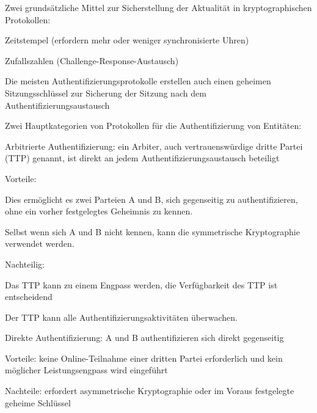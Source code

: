 \documentclass[a4paper]{article}
\begin{document}
\begin{multicols}{3}
\begin{itemize*}
\begin{itemize*}
                  \item Zwei grundsätzliche Mittel zur Sicherstellung der Aktualität in kryptographischen Protokollen:
                  \begin{itemize*} \item Zeitstempel (erfordern mehr oder weniger synchronisierte Uhren) \item Zufallszahlen (Challenge-Response-Austausch) \end{itemize*}
            \end{itemize*}
            \item Die meisten Authentifizierungsprotokolle erstellen auch einen geheimen
            Sitzungsschlüssel zur Sicherung der Sitzung nach dem
            Authentifizierungsaustausch
            \item Zwei Hauptkategorien von Protokollen für die Authentifizierung von
            Entitäten:
            \begin{itemize*}
                  \item Arbitrierte Authentifizierung: ein Arbiter, auch vertrauenswürdige dritte Partei (TTP) genannt, ist direkt an jedem Authentifizierungsaustausch beteiligt
                  \begin{itemize*} \item Vorteile:
                        \begin{itemize*} \item Dies ermöglicht es zwei Parteien A und B, sich gegenseitig zu authentifizieren, ohne ein vorher festgelegtes Geheimnis zu kennen. \item Selbst wenn sich A und B nicht kennen, kann die symmetrische Kryptographie verwendet werden. \end{itemize*} \item Nachteilig:
                        \begin{itemize*} \item Das TTP kann zu einem Engpass werden, die Verfügbarkeit des TTP ist entscheidend \item Der TTP kann alle Authentifizierungsaktivitäten überwachen. \end{itemize*} \end{itemize*}
                  \item Direkte Authentifizierung: A und B authentifizieren sich direkt gegenseitig
                  \begin{itemize*} \item Vorteile: keine Online-Teilnahme einer dritten Partei erforderlich und kein möglicher Leistungsengpass wird eingeführt \item Nachteile: erfordert asymmetrische Kryptographie oder im Voraus festgelegte geheime Schlüssel \end{itemize*}
            \end{itemize*}
      \end{itemize*}



\end{multicols}
\end{document}

